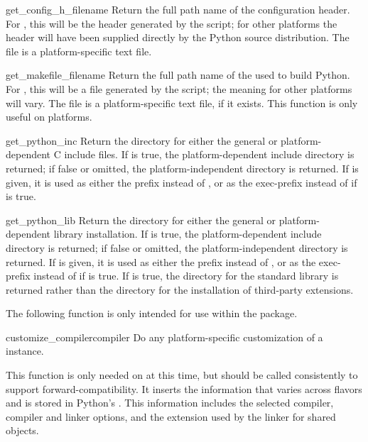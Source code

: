 \begin{funcdesc}{get_config_h_filename}{}
  Return the full path name of the configuration header.  For \UNIX,
  this will be the header generated by the  script;
  for other platforms the header will have been supplied directly by
  the Python source distribution.  The file is a platform-specific
  text file.
\end{funcdesc}

\begin{funcdesc}{get_makefile_filename}{}
  Return the full path name of the  used to build
  Python.  For \UNIX, this will be a file generated by the
   script; the meaning for other platforms will
  vary.  The file is a platform-specific text file, if it exists.
  This function is only useful on \POSIX{} platforms.
\end{funcdesc}

\begin{funcdesc}{get_python_inc}{}
  Return the directory for either the general or platform-dependent C
  include files.  If  is true, the
  platform-dependent include directory is returned; if false or
  omitted, the platform-independent directory is returned.  If
   is given, it is used as either the prefix instead of
  , or as the exec-prefix instead of
   if  is true.
\end{funcdesc}

\begin{funcdesc}{get_python_lib}{}
  Return the directory for either the general or platform-dependent
  library installation.  If  is true, the
  platform-dependent include directory is returned; if false or
  omitted, the platform-independent directory is returned.  If
   is given, it is used as either the prefix instead of
  , or as the exec-prefix instead of
   if  is true.  If
   is true, the directory for the standard library
  is returned rather than the directory for the installation of
  third-party extensions.
\end{funcdesc}


The following function is only intended for use within the
 package.

\begin{funcdesc}{customize_compiler}{compiler}
  Do any platform-specific customization of a
   instance.

  This function is only needed on \UNIX{} at this time, but should be
  called consistently to support forward-compatibility.  It inserts
  the information that varies across \UNIX{} flavors and is stored in
  Python's .  This information includes the selected
  compiler, compiler and linker options, and the extension used by the
  linker for shared objects.
\end{funcdesc}


